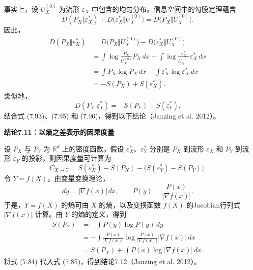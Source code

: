事实上，设 $U_X^{(0)}$ 为流形 $\varepsilon_X$ 中包含的均匀分布。信息空间中的勾股定理蕴含
\begin{equation}
D(P_X\Vert\varepsilon_X^*)+D\bigl(\varepsilon_X^*\Vert U_X^{(0)}\bigr)
=D\bigl(P_X\Vert U_X^{(0)}\bigr).
\tag{7.94}
\end{equation}
因此，
\begin{equation}
\begin{aligned}
D(P_X\Vert\varepsilon_X^*)
&=D\bigl(P_X\Vert U_X^{(0)}\bigr)-D\bigl(\varepsilon_X^*\Vert U_X^{(0)}\bigr)\\
&=\int\log\frac{P_X}{U_X^{(0)}}P_X\,dx
-\int\log\frac{\varepsilon_X^*}{U_X^{(0)}}\varepsilon_X^*\,dx\\
&=\int P_X\log P_X\,dx-\int\varepsilon_X^*\log\varepsilon_X^*\,dx\\
&=-S(P_X)+S(\varepsilon_X^*).
\end{aligned}
\tag{7.95}
\end{equation}
类似地，
\begin{equation}
D(P_Y\Vert\varepsilon_Y^*)=-S(P_Y)+S(\varepsilon_Y^*).
\tag{7.96}
\end{equation}
结合式 (7.93)、(7.95) 和 (7.96)，得到以下结论（Janzing et al. 2012）。

\par\medskip{}\noindent\textbf{结论7.11：以熵之差表示的因果度量}\par
设 $P_X$ 与 $P_Y$ 为 $\mathbb R^d$ 上的密度函数。假设 $\varepsilon_X^*$、$\varepsilon_Y^*$ 分别是 $P_X$ 到流形 $\varepsilon_X$ 和 $P_Y$ 到流形 $\varepsilon_Y$ 的投影，则因果度量可计算为
\begin{equation}
C_{X\to Y}=S(\varepsilon_X^*)-S(P_X)-\bigl(S(\varepsilon_Y^*)-S(P_Y)\bigr).
\tag{7.97}
\end{equation}
令 $Y=f(X)$。由变量变换理论，
\[
dy=|\nabla f(x)|\,dx,\qquad P(y)=\frac{P(x)}{|\nabla f(x)|}.
\]
于是，$Y=f(X)$ 的熵可由 $X$ 的熵，以及变换函数 $f(X)$ 的Jacobian行列式 $|\nabla f(x)|$ 计算。由 $Y$ 的熵的定义，得到
\begin{equation}
\begin{aligned}
S(P_Y)&=-\int P(y)\log P(y)\,dy\\
&=-\int\frac{P(x)}{|\nabla f(x)|}\log\frac{P(x)}{|\nabla f(x)|}|\nabla f(x)|\,dx\\
&=S(P_X)+\int P(x)\log|\nabla f(x)|\,dx.
\end{aligned}
\tag{7.98}
\end{equation}
将式 (7.84) 代入式 (7.85)，得到结论7.12（Janzing et al. 2012）。

